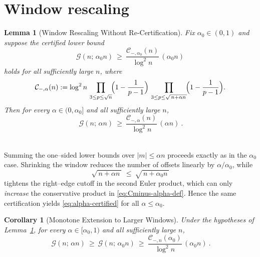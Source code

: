 \documentclass[11pt]{article}
\makeatletter
\theoremstyle{inline}
\theoremstyle{break}
\newtheorem{lemma}{Lemma}
\renewenvironment{proof}[1][\proofname]{%
  \par\pushQED{\qed}%
  \normalfont \topsep6\p@\@plus6\p@\relax
  \trivlist
  \item[\hskip\labelsep
        \itshape
    #1\@addpunct{.}]\mbox{}\\  %
}{%
  \popQED\endtrivlist\@endpefalse
}
\theoremstyle{break}
\theoremstyle{break}
\theoremstyle{break}
\theoremstyle{break}
\theoremstyle{break}
\newtheorem{corollary}{Corollary}
\theoremstyle{break}
\theoremstyle{inline}
\newcommand{\CminusProductAlpha}[2]{\mathcal{C}_{-,#2}\!\left(#1\right)}
\makeatother
\begin{document}
\section{Window rescaling}\label{app:window-rescale}

\begin{lemma}[Window Rescaling Without Re-Certification]
\label{lem:alpha-rescale}
Fix \(\alpha_0\in(0,1)\) and suppose the certified lower bound
\begin{equation}\label{eq:alpha0-certified}
\mathcal G(n;\,\alpha_0 n)\ \ge\ \frac{\CminusProductAlpha{n}{\alpha_0}}{\log^2 n}\,(\alpha_0 n)
\end{equation}
holds for all sufficiently large \(n\), where
\begin{equation}\label{eq:Cminus-alpha-def}
\CminusProductAlpha{n}{\alpha}
:=\log^2 n\,
\prod_{3\le p\le \sqrt n}\!\Bigl(1-\frac{1}{p-1}\Bigr)\,
\prod_{3\le p\le \sqrt{\,n+\alpha n\,}}\!\Bigl(1-\frac{1}{p-1}\Bigr).
\end{equation}
Then for every \(\alpha\in(0,\alpha_0]\) and all sufficiently large \(n\),
\begin{equation}\label{eq:alpha-certified}
\boxed{\ \ \mathcal G(n;\,\alpha n)\ \ge\ \frac{\CminusProductAlpha{n}{\alpha}}{\log^2 n}\,(\alpha n)\ .\ }
\end{equation}
\end{lemma}

\begin{proof}
Summing the one–sided lower bounds over \(|m|\le \alpha n\) proceeds exactly as in the \(\alpha_0\) case. Shrinking the window reduces the number of offsets linearly by \(\alpha/\alpha_0\), while
\begin{equation}\label{eq:right-edge-shift}
\sqrt{\,n+\alpha n\,}\ \le\ \sqrt{\,n+\alpha_0 n\,}
\end{equation}
tightens the right–edge cutoff in the second Euler product, which can only \emph{increase} the conservative product in \eqref{eq:Cminus-alpha-def}. Hence the same certification yields \eqref{eq:alpha-certified} for all \(\alpha\le\alpha_0\).
\end{proof}

\begin{corollary}[Monotone Extension to Larger Windows]
\label{cor:alpha-superset}
Under the hypotheses of Lemma~\ref{lem:alpha-rescale}, for every \(\alpha\in[\alpha_0,1)\) and all sufficiently large \(n\),
\begin{equation}\label{eq:alpha-superset}
\boxed{\ \ \mathcal G(n;\,\alpha n)\ \ge\ \mathcal G(n;\,\alpha_0 n)\ \ge\ \frac{\CminusProductAlpha{\alpha_0}{n}}{\log^2 n}\,(\alpha_0 n)\ .\ }
\end{equation}
\end{corollary}
\end{document}
